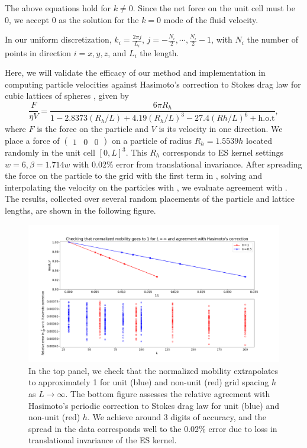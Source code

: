 The above equations hold for $k \neq 0$. Since the net force on the unit cell must be 0, we accept 0 as the solution for the $k=0$ mode of the fluid velocity.

In our uniform discretization, $k_i = \frac{2\pi j}{L_i}$, $j = -\frac{N_i}{2},\cdots, \frac{N_i}{2}-1$, with $N_i$ the number of points in direction $i=x,y,z$, and $L_i$ the length. 

Here, we will validate the efficacy of our method and implementation in computing particle velocities against Hasimoto's correction to Stokes drag law for cubic lattices of spheres \cite{hasimoto}, given by
\begin{equation}\label{pbccorr}
\displaystyle \frac{F}{\eta V} = \frac{6\pi R_h}{1 - 2.8373(R_h/L) + 4.19(R_h/L)^3 - 27.4(Rh/L)^6 + \text{h.o.t}},
\end{equation}
where $F$ is the force on the particle and $V$ is its velocity in one direction. We place a force of $\begin{pmatrix}1&0&0\end{pmatrix}$ on a particle of radius $R_h = 1.5539h$ located randomly in the unit cell $[0,L]^3$. This $R_h$ corresponds to ES kernel settings $w=6,\beta = 1.714 w$ with 0.02\% error from translational invariance. After spreading the force on the particle to the grid with the first term in , solving  and interpolating the velocity on the particles with , we evaluate agreement with . The results, collected over several random placements of the particle and lattice lengths, are shown in the following figure.
\begin{figure}[H]
	\centering
	\includegraphics[width=1\linewidth]{./Figures/L_extrap_hasimoto_TP}
	\caption{In the top panel, we check that the normalized mobility extrapolates to approximately 1 for unit (blue) and non-unit (red) grid spacing $h$ as $L \to \infty$. The bottom figure assesses the relative agreement with Hasimoto's periodic correction to Stokes drag law  for unit (blue) and non-unit (red) $h$. We achieve around 3 digits of accuracy, and the spread in the data corresponds well to the 0.02\% error due to loss in translational invariance of the ES kernel.}\label{fig4}
\end{figure}



\clearpage
\newpage
{}

%


